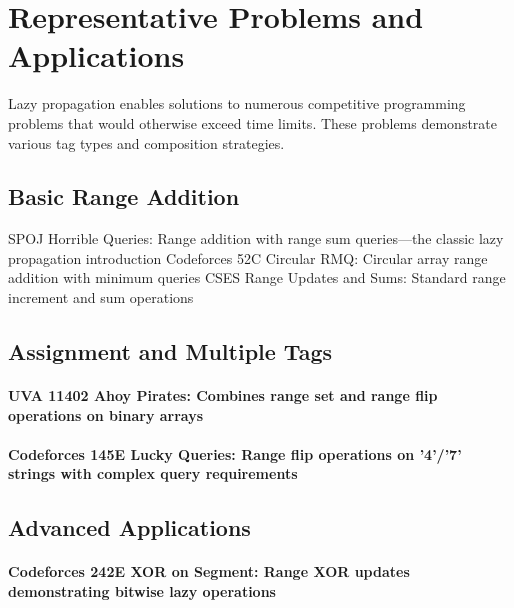 \section{Representative Problems and Applications}
\label{sec:practice_problems}
Lazy propagation enables solutions to numerous competitive programming problems that would otherwise exceed time limits. These problems demonstrate various tag types and composition strategies.
\subsection{Basic Range Addition}
SPOJ Horrible Queries: Range addition with range sum queries—the classic lazy propagation introduction
Codeforces 52C Circular RMQ: Circular array range addition with minimum queries
CSES Range Updates and Sums: Standard range increment and sum operations

\subsection{Assignment and Multiple Tags}

\paragraph{UVA 11402 Ahoy Pirates: Combines range set and range flip operations on binary arrays}

\paragraph{Codeforces 145E Lucky Queries: Range flip operations on '4'/'7' strings with complex query requirements}

\subsection{Advanced Applications}

\paragraph{Codeforces 242E XOR on Segment: Range XOR updates demonstrating bitwise lazy operations}

